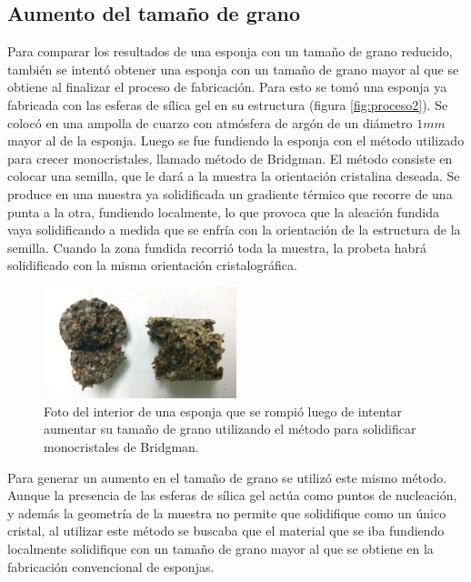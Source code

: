 \documentclass[a4paper,12pt,fleqn,twoside,openany]{book}
\begin{document}
   




\subsection{Aumento del tamaño de grano} \label{aumento}


Para comparar los resultados de una esponja con un tamaño de grano reducido, también se intentó obtener una esponja con un tamaño de grano mayor al que se obtiene al finalizar el proceso de fabricación. Para esto se tomó una esponja ya fabricada con las esferas de sílica gel en su estructura (figura \ref{fig:proceso2}). Se colocó en una ampolla de cuarzo con atmósfera de argón de un diámetro  $1 mm$ mayor al de la esponja. Luego se fue fundiendo la esponja con el método utilizado para crecer monocristales, llamado método de Bridgman. El método consiste en colocar una semilla, que le dará a la muestra la orientación cristalina deseada. Se produce en una muestra ya solidificada un gradiente térmico que recorre de una punta a la otra, fundiendo localmente, lo que provoca que la aleación fundida vaya solidificando a medida que se enfría con la orientación de la estructura de la semilla. Cuando la zona fundida recorrió toda la muestra, la probeta habrá solidificado con la misma orientación cristalográfica.

 \begin{figure}[h]
 \centering
 \includegraphics[width=0.5\textwidth]{Img/Resultados/EspRota.jpg}
 \caption{Foto del interior de una esponja que se rompió luego de intentar aumentar su tamaño de grano utilizando el método para solidificar monocristales de Bridgman.} 
 \label{fig: EspRota}
 \end{figure}

Para generar un aumento en el tamaño de grano se utilizó este mismo método. Aunque la presencia de las esferas de sílica gel actúa como puntos de nucleación, y además la geometría de la muestra no permite que solidifique como un único cristal, al utilizar este método se buscaba que el material que se iba fundiendo localmente solidifique con un tamaño de grano mayor al que se obtiene en la fabricación convencional de esponjas.
\end{document}
